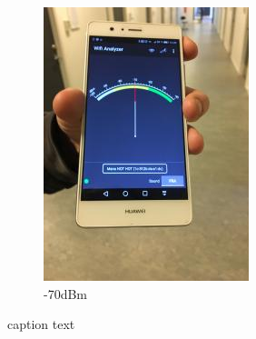 \begin{figure}[h]
\begin{subfigure}{.49\textwidth}
        \includegraphics[width=\textwidth]{figures/image2.jpg} 
        \caption{-70dBm}
        \label{fig:wifitest2}
    \end{subfigure}
\caption{caption text}
\label{fig:wifitest12}
\end{figure}